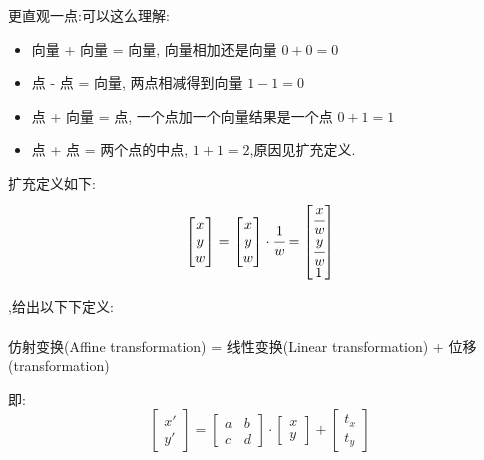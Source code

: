 \documentclass[UTF8,12pt]{ctexbook}
\begin{document}
{{{{        更直观一点:可以这么理解:
        \begin{itemize}
          \item 向量 + 向量 = 向量, 向量相加还是向量 $0 + 0 = 0$
          \item 点 - 点 = 向量, 两点相减得到向量 $1 - 1 = 0$
          \item 点 + 向量 = 点, 一个点加一个向量结果是一个点 $0 + 1 = 1$
          \item 点 + 点 = 两个点的中点, $1 + 1 = 2$,原因见扩充定义.
        \end{itemize}
        扩充定义如下:
        $$\begin{bmatrix}
            x \\
            y \\
            w
          \end{bmatrix} = \begin{bmatrix}
            x \\
            y \\
            w
          \end{bmatrix}\cdot\cfrac{1}{w} = \begin{bmatrix}
            \cfrac{x}{w} \\
            \cfrac{y}{w} \\
            1
          \end{bmatrix}$$

        {,给出以下下定义:}\\\\\indent
        仿射变换(Affine transformation) = 线性变换(Linear transformation) + 位移(transformation)

        即:
        $$\begin{bmatrix}
            x\prime \\
            y\prime
          \end{bmatrix}
          =
          \begin{bmatrix}
            a & b \\
            c & d
          \end{bmatrix}
          \cdot
          \begin{bmatrix}
            x \\
            y
          \end{bmatrix}
          +
          \begin{bmatrix}
            t_x \\
            t_y
          \end{bmatrix}$$

}}}}
\end{document}
